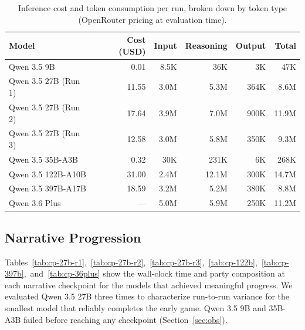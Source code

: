 \documentclass{article}
\begin{document}
\begin{table}[h]
\centering
\small
\caption{Inference cost and token consumption per run, broken down by token type (OpenRouter pricing at evaluation time).}
\label{tab:cost}
\begin{tabular}{lrrrrr}
\toprule
Model & Cost (USD) & Input & Reasoning & Output & Total \\
\midrule
Qwen 3.5 9B          &  0.01 &  8.5K &   36K &   3K &   47K \\
Qwen 3.5 27B (Run 1) & 11.55 &  3.0M &  5.3M & 364K &  8.6M \\
Qwen 3.5 27B (Run 2) & 17.64 &  3.9M &  7.0M & 900K & 11.9M \\
Qwen 3.5 27B (Run 3) & 12.58 &  3.0M &  5.8M & 350K &  9.3M \\
Qwen 3.5 35B-A3B     &  0.32 &   30K &  231K &   6K &  268K \\
Qwen 3.5 122B-A10B   & 31.00 &  2.4M & 12.1M & 300K & 14.7M \\
Qwen 3.5 397B-A17B   & 18.59 &  3.2M &  5.2M & 380K &  8.8M \\
Qwen 3.6 Plus        &  --- &  5.0M &  5.9M & 250K & 11.2M \\
\bottomrule
\end{tabular}
\end{table}

\subsection{Narrative Progression}

Tables~\ref{tab:cp-27b-r1},~\ref{tab:cp-27b-r2},~\ref{tab:cp-27b-r3},~\ref{tab:cp-122b},~\ref{tab:cp-397b},~and~\ref{tab:cp-36plus} show the wall-clock time and party composition at each narrative checkpoint for the models that achieved meaningful progress. We evaluated Qwen 3.5 27B three times to characterize run-to-run variance for the smallest model that reliably completes the early game. Qwen 3.5 9B and 35B-A3B failed before reaching any checkpoint (Section~\ref{sec:obs}).
\end{document}
